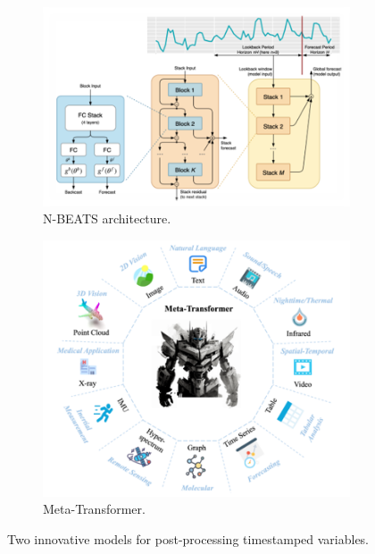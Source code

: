 \begin{figure}[htb!]
    \begin{subfigure}[h]{0.5\linewidth}
        \includegraphics[width=\columnwidth]{figures/n-beats.png}
        \caption{N-BEATS architecture.}
    \end{subfigure}
    \hfill
    \begin{subfigure}[h]{0.5\linewidth}
        \includegraphics[width=\columnwidth]{figures/meta-transformer.png}
        \caption{Meta-Transformer.}
    \end{subfigure}
    \caption{Two innovative models for post-processing timestamped variables.}
    \label{fig:innovative_models}
\end{figure}